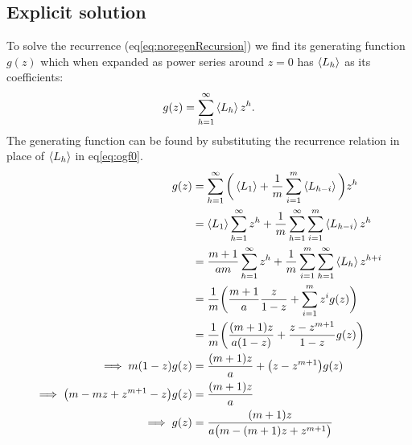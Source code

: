 \subsection{Explicit solution}
To solve the recurrence (eq\ref{eq:noregenRecursion}) we find its generating function $g(z)$ which when expanded as power series around $z=0$ has $\left\langle L_h \right\rangle$ as its coefficients:
\begin{align}
	g(z) = \sum_{h=1}^{\infty} \left\langle L_h \right\rangle z^h\label{eq:ogf0}.
\end{align}
The generating function can be found by substituting the recurrence relation in place of $\left\langle L_h \right\rangle$ in eq\ref{eq:ogf0}.
\begin{align}
	g(z)
		&= \sum_{h=1}^\infty\bigg(\left\langle L_1 \right\rangle + \frac{1}{m}\sum_{i=1}^m \left\langle L_{h-i} \right\rangle\bigg)z^h\nonumber\\
		&= \left\langle L_1 \right\rangle\sum_{h=1}^\infty z^h + \frac{1}{m} \sum_{h=1}^\infty\sum_{i=1}^m \left\langle L_{h-i} \right\rangle z^h \nonumber\\
		&= \frac{m+1}{am}\sum_{h=1}^\infty z^h + \frac{1}{m} \sum_{i=1}^m\sum_{h=1}^\infty \left\langle L_h \right\rangle z^{h+i} \nonumber\\
		&= \frac{1}{m}\bigg(\frac{m+1}{a}\frac{z}{1-z} + \sum_{i=1}^m z^i g(z)\bigg)\nonumber\\
		&= \frac{1}{m}\bigg(\frac{(m+1)z}{a(1-z)} + \frac{z - z^{m+1}}{1-z} g(z)\bigg)\nonumber\\
	\implies m(1-z)g(z) &= \frac{(m+1)z}{a} + \big(z - z^{m+1}\big)g(z)\nonumber\\
	\implies \big(m - mz + z^{m+1} - z\big)g(z) &= \frac{(m+1)z}{a}\nonumber\\
	\implies g(z) &= \frac{(m+1)z}{a\big(m - (m+1)z + z^{m+1}\big)}\label{eq:ogf1}
\end{align}

